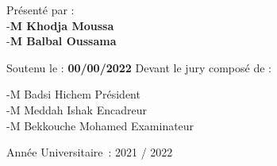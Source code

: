 \begin{titlepage}
\begin{center}
        \vspace{0.5cm}
        
        Présenté par : \\
        -\textbf{M Khodja Moussa} \\
        -\textbf{M Balbal Oussama} \\
        	

        \vspace{0.5cm}

        Soutenu le : \textbf{00/00/2022} Devant le jury composé de :\\
    \end{center}
        -M  Badsi Hichem Président \\
        -M  Meddah Ishak Encadreur \\
        -M  Bekkouche Mohamed Examinateur \\
    
    \begin{center}
        \vfill
        Année Universitaire : 2021 / 2022
    \end{center}
\end{titlepage}
